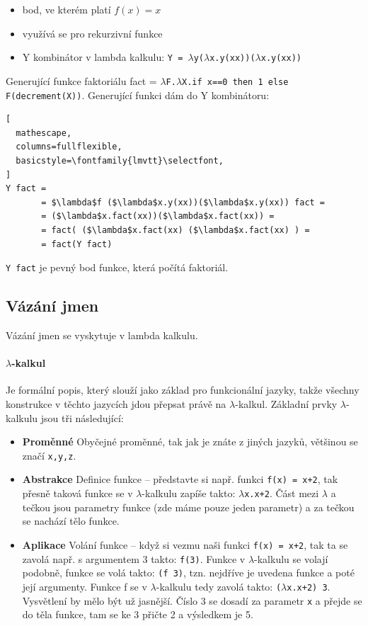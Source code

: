 \begin{itemize}
\item bod, ve kterém platí $f(x) = x$
\item využívá se pro rekurzivní funkce
\item Y kombinátor v lambda kalkulu: \texttt{Y = $\lambda$y($\lambda$x.y(xx))($\lambda$x.y(xx))}
\end{itemize}

\priklad
Generující funkce faktoriálu fact = \texttt{$\lambda$F.$\lambda$X.if x==0 then 1 else F(decrement(X))}. Generující funkci dám do Y kombinátoru:

\begin{lstlisting}[
  mathescape,
  columns=fullflexible,
  basicstyle=\fontfamily{lmvtt}\selectfont,
]
Y fact =
       = $\lambda$f ($\lambda$x.y(xx))($\lambda$x.y(xx)) fact =
       = ($\lambda$x.fact(xx))($\lambda$x.fact(xx)) =
       = fact( ($\lambda$x.fact(xx) ($\lambda$x.fact(xx) ) =
       = fact(Y fact)
\end{lstlisting}

\noindent \texttt{Y fact} je pevný bod funkce, která počítá faktoriál.

\subsection{Vázání jmen}
Vázání jmen se vyskytuje v lambda kalkulu.
\paragraph{$\lambda$-kalkul} Je formální popis, který slouží jako základ pro funkcionální jazyky, takže všechny konstrukce v těchto jazycích jdou přepsat právě na $\lambda$-kalkul. Základní prvky $\lambda$-kalkulu jsou tři následující:
\begin{itemize}
\item \textbf{Proměnné} Obyčejné proměnné, tak jak je znáte z jiných jazyků, většinou se značí \texttt{x,y,z}.

\item \textbf{Abstrakce} Definice funkce – představte si např. funkci \texttt{f(x) = x+2}, tak přesně taková funkce se v $\lambda$-kalkulu zapíše takto: \texttt{$\lambda$x.x+2}. Část mezi $\lambda$ a tečkou jsou parametry funkce (zde máme pouze jeden parametr) a za tečkou se nachází tělo funkce.

\item \textbf{Aplikace} Volání funkce – když si vezmu naši funkci \texttt{f(x) = x+2}, tak ta se zavolá např. s argumentem 3 takto: \texttt{f(3)}. Funkce v $\lambda$-kalkulu se volají podobně, funkce se volá takto: \texttt{(f 3)}, tzn. nejdříve je uvedena funkce a poté její argumenty. Funkce f se v $\lambda$-kalkulu tedy zavolá takto: \texttt{($\lambda$x.x+2) 3}. Vysvětlení by mělo být už jasnější. Číslo 3 se dosadí za parametr \texttt{x} a přejde se do těla funkce, tam se ke 3 přičte 2 a výsledkem je 5.
\end{itemize}

